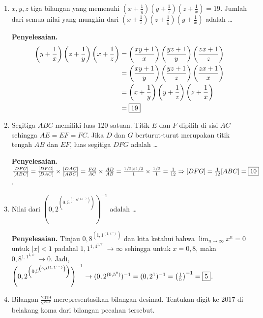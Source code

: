 \documentclass[12pt]{scrartcl}
\begin{document}
\begin{enumerate}
    \item $x, y, z$ tiga bilangan yang memenuhi $(x+\frac{1}{y})(y+\frac{1}{z})(z+\frac{1}{x}) = 19$. Jumlah dari semua nilai yang mungkin dari $(x+\frac{1}{z})(z+\frac{1}{y})(y+\frac{1}{x})$ adalah \dots
    
    \textbf{Penyelesaian.} 
    \begin{align*}
        \left(y+\frac{1}{x}\right)\left(z+\frac{1}{y}\right)\left(x+\frac{1}{z}\right) &= \left(\frac{xy+1}{x}\right)\left(\frac{yz+1}{y}\right)\left(\frac{zx+1}{z}\right) \\
        &= \left(\frac{xy+1}{y}\right)\left(\frac{yz+1}{z}\right)\left(\frac{zx+1}{x}\right) \\
        &= \left(x+\frac{1}{y}\right)\left(y+\frac{1}{z}\right)\left(z+\frac{1}{x}\right) \\
        &= \fbox{19}
    \end{align*}
    
    \item Segitiga $ABC$ memiliki luas 120 satuan. Titik $E$ dan $F$ dipilih di sisi $AC$ sehingga $AE=EF=FC$. Jika $D$ dan $G$ berturut-turut merupakan titik tengah $AB$ dan $EF$, luas segitiga $DFG$ adalah \dots
    
    \textbf{Penyelesaian.} 
    $\frac{[DFG]}{[ABC]} = \frac{[DFG]}{[DAC]} \times \frac{[DAC]}{[ABC]} = \frac{FG}{AC} \times \frac{AD}{AB} = \frac{1/2 \times 1/3}{1} \times \frac{1/2}{1} = \frac{1}{12} \Rightarrow [DFG] = \frac{1}{12}[ABC] = \fbox{10}$.
    
    \item Nilai dari $\left(0,2^{\left(0,5^{\left(0,8^{\left(1,1^{\dots}\right)}\right)}\right)}\right)^{-1}$ adalah \dots
    
    \textbf{Penyelesaian.} Tinjau $0,8^{(1,1^{(1,4^{\dots})})}$ dan kita ketahui bahwa $\lim_{n \to \infty} x^n = 0$ untuk $|x|<1$ padahal $1,1^{1,4^{1,7^{\dots}}} \to \infty$ sehingga untuk $x=0,8$, maka $0,8^{1,1^{1,4^{\dots}}} \to 0$.
    Jadi, $\left(0,2^{\left(0,5^{\left(0,8^{\left(1,1^{\dots}\right)}\right)}\right)}\right)^{-1} \to (0,2^{(0,5^0)})^{-1} = (0,2^1)^{-1} = \left(\frac{1}{5}\right)^{-1} = \fbox{5}$.
    
    \item Bilangan $\frac{2019}{2^{2019}}$ merepresentasikan bilangan desimal. Tentukan digit ke-2017 di belakang koma dari bilangan pecahan tersebut.
    

\end{enumerate}
\end{document}
